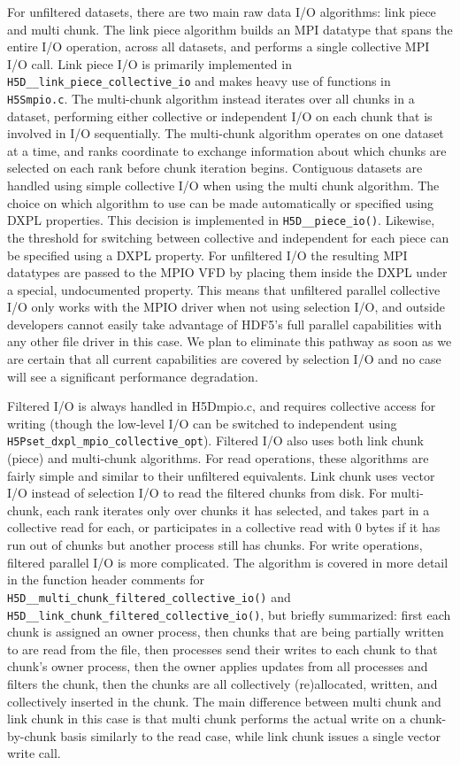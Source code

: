 \begin{itemize}
For unfiltered datasets, there are two main raw data I/O algorithms: link piece and multi chunk. The link piece algorithm builds an MPI datatype that spans the entire I/O operation, across all datasets, and performs a single collective MPI I/O call. Link piece I/O is primarily implemented in \texttt{H5D\_\_link\_piece\_collective\_io} and makes heavy use of functions in \texttt{H5Smpio.c}. The multi-chunk algorithm instead iterates over all chunks in a dataset, performing either collective or independent I/O on each chunk that is involved in I/O sequentially. The multi-chunk algorithm operates on one dataset at a time, and ranks coordinate to exchange information about which chunks are selected on each rank before chunk iteration begins. Contiguous datasets are handled using simple collective I/O when using the multi chunk algorithm. The choice on which algorithm to use can be made automatically or specified using DXPL properties. This decision is implemented in \texttt{H5D\_\_piece\_io()}. Likewise, the threshold for switching between collective and independent for each piece can be specified using a DXPL property. For unfiltered I/O the resulting MPI datatypes are passed to the MPIO VFD by placing them inside the DXPL under a special, undocumented property. This means that unfiltered parallel collective I/O only works with the MPIO driver when not using selection I/O, and outside developers cannot easily take advantage of HDF5's full parallel capabilities with any other file driver in this case. We plan to eliminate this pathway as soon as we are certain that all current capabilities are covered by selection I/O and no case will see a significant performance degradation.

Filtered I/O is always handled in H5Dmpio.c, and requires collective access for writing (though the low-level I/O can be switched to independent using \texttt{H5Pset\_dxpl\_mpio\_collective\_opt}). Filtered I/O also uses both link chunk (piece) and multi-chunk algorithms. For read operations, these algorithms are fairly simple and similar to their unfiltered equivalents. Link chunk uses vector I/O instead of selection I/O to read the filtered chunks from disk. For multi-chunk, each rank iterates only over chunks it has selected, and takes part in a collective read for each, or participates in a collective read with 0 bytes if it has run out of chunks but another process still has chunks. For write operations, filtered parallel I/O is more complicated. The algorithm is covered in more detail in the function header comments for \texttt{H5D\_\_multi\_chunk\_filtered\_collective\_io()} and \texttt{H5D\_\_link\_chunk\_filtered\_collective\_io()}, but briefly summarized: first each chunk is assigned an owner process, then chunks that are being partially written to are read from the file, then processes send their writes to each chunk to that chunk's owner process, then the owner applies updates from all processes and filters the chunk, then the chunks are all collectively (re)allocated, written, and collectively inserted in the chunk. The main difference between multi chunk and link chunk in this case is that multi chunk performs the actual write on a chunk-by-chunk basis similarly to the read case, while link chunk issues a single vector write call.


\end{itemize}
